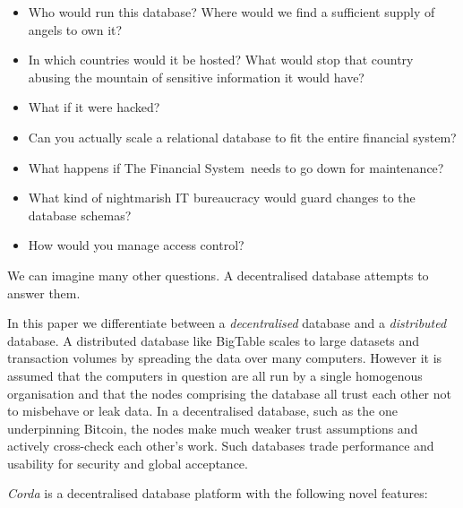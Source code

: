 \documentclass{article}
\begin{document}
\begin{itemize}
\item Who would run this database? Where would we find a sufficient supply of angels to own it?
\item In which countries would it be hosted? What would stop that country abusing the mountain of sensitive information it would have?
\item What if it were hacked?
\item Can you actually scale a relational database to fit the entire financial system?
\item What happens if The Financial System\texttrademark~needs to go down for maintenance?
\item What kind of nightmarish IT bureaucracy would guard changes to the database schemas?
\item How would you manage access control?
\end{itemize}

We can imagine many other questions. A decentralised database attempts to answer them.

In this paper we differentiate between a \emph{decentralised} database and a \emph{distributed} database. A distributed
database like BigTable\cite{BigTable} scales to large datasets and transaction volumes by spreading the data over many
computers. However it is assumed that the computers in question are all run by a single homogenous organisation and that
the nodes comprising the database all trust each other not to misbehave or leak data. In a decentralised database, such
as the one underpinning Bitcoin\cite{Bitcoin}, the nodes make much weaker trust assumptions and actively cross-check
each other's work. Such databases trade performance and usability for security and global acceptance.

\emph{Corda} is a decentralised database platform with the following novel features:
\end{document}
